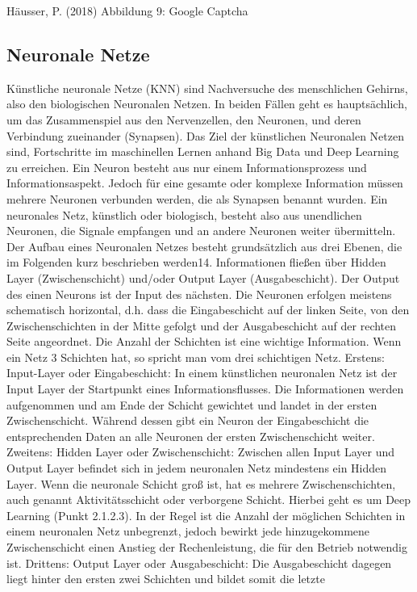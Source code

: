 Häusser, P. (2018)
Abbildung 9: Google Captcha

\subsection{Neuronale Netze}

Künstliche neuronale Netze (KNN) sind Nachversuche des menschlichen Gehirns, also den biologischen Neuronalen Netzen. In beiden Fällen geht es hauptsächlich, 
um das Zusammenspiel aus den Nervenzellen, den Neuronen, und deren Verbindung zueinander (Synapsen). Das Ziel der künstlichen Neuronalen Netzen sind, Fortschritte 
im maschinellen Lernen anhand Big Data und Deep Learning zu erreichen. Ein Neuron besteht aus nur einem Informationsprozess und Informationsaspekt. Jedoch für 
eine gesamte oder komplexe Information müssen mehrere Neuronen verbunden werden, die als Synapsen benannt wurden. Ein neuronales Netz, künstlich oder biologisch, 
besteht also aus unendlichen Neuronen, die Signale empfangen und an andere Neuronen weiter übermitteln. Der Aufbau eines Neuronalen Netzes besteht grundsätzlich 
aus drei Ebenen, die im Folgenden kurz beschrieben werden14. Informationen fließen über Hidden Layer (Zwischenschicht) und/oder Output Layer (Ausgabeschicht). 
Der Output des einen Neurons ist der Input des nächsten. Die Neuronen erfolgen meistens schematisch horizontal, d.h. dass die Eingabeschicht auf der linken Seite, 
von den Zwischenschichten in der Mitte gefolgt und der Ausgabeschicht auf der rechten Seite angeordnet. Die Anzahl der Schichten ist eine wichtige Information. 
Wenn ein Netz 3 Schichten hat, so spricht man vom drei schichtigen Netz. Erstens: Input-Layer oder Eingabeschicht: In einem künstlichen neuronalen Netz ist der 
Input Layer der Startpunkt eines Informationsflusses. Die Informationen werden aufgenommen und am Ende der Schicht gewichtet und landet in der ersten Zwischenschicht. 
Während dessen gibt ein Neuron der Eingabeschicht die entsprechenden Daten an alle Neuronen der ersten Zwischenschicht weiter. Zweitens: Hidden Layer oder 
Zwischenschicht: Zwischen allen Input Layer und Output Layer befindet sich in jedem neuronalen Netz mindestens ein Hidden Layer. Wenn die neuronale Schicht groß ist,
hat es mehrere Zwischenschichten, auch genannt Aktivitätsschicht oder verborgene Schicht. Hierbei geht es um Deep Learning (Punkt 2.1.2.3). In der Regel ist die 
Anzahl der möglichen Schichten in einem neuronalen Netz unbegrenzt, jedoch bewirkt jede hinzugekommene Zwischenschicht einen Anstieg der Rechenleistung, die für 
den Betrieb notwendig ist. Drittens: Output Layer oder Ausgabeschicht: Die Ausgabeschicht dagegen liegt hinter den ersten zwei Schichten und bildet somit die letzte 
